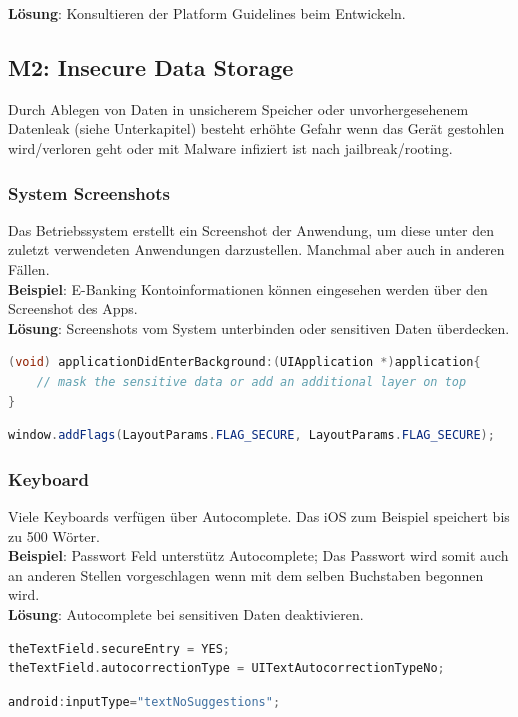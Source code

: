 \textbf{Lösung}: Konsultieren der Platform Guidelines beim Entwickeln.

\subsection{M2: Insecure Data Storage}
Durch Ablegen von Daten in unsicherem Speicher oder unvorhergesehenem Datenleak (siehe Unterkapitel) besteht erhöhte Gefahr wenn das Gerät gestohlen wird/verloren geht oder mit Malware infiziert ist nach jailbreak/rooting.

\subsubsection{System Screenshots}
Das Betriebssystem erstellt ein Screenshot der Anwendung, um diese unter den zuletzt verwendeten Anwendungen darzustellen. Manchmal aber auch in anderen Fällen.\\

\textbf{Beispiel}: E-Banking Kontoinformationen können eingesehen werden über den Screenshot des Apps. \\

\textbf{Lösung}: Screenshots vom System unterbinden oder sensitiven Daten überdecken.
\begin{lstlisting}[language=C, caption=Lösung für iOS]
(void) applicationDidEnterBackground:(UIApplication *)application{
	// mask the sensitive data or add an additional layer on top			
}
\end{lstlisting}
\begin{lstlisting}[language=Java, caption=Lösung für Android]
window.addFlags(LayoutParams.FLAG_SECURE, LayoutParams.FLAG_SECURE);
\end{lstlisting}

\subsubsection{Keyboard}
Viele Keyboards verfügen über Autocomplete. Das iOS zum Beispiel speichert bis zu 500 Wörter.\\

\textbf{Beispiel}: Passwort Feld unterstütz Autocomplete; Das Passwort wird somit auch an anderen Stellen vorgeschlagen wenn mit dem selben Buchstaben begonnen wird. \\

\textbf{Lösung}: Autocomplete bei sensitiven Daten deaktivieren.
\begin{lstlisting}[language=C, caption=Lösung für iOS]
theTextField.secureEntry = YES;
theTextField.autocorrectionType = UITextAutocorrectionTypeNo;
\end{lstlisting}
\begin{lstlisting}[language=Java, caption=Lösung für Android]
android:inputType="textNoSuggestions";
\end{lstlisting}

